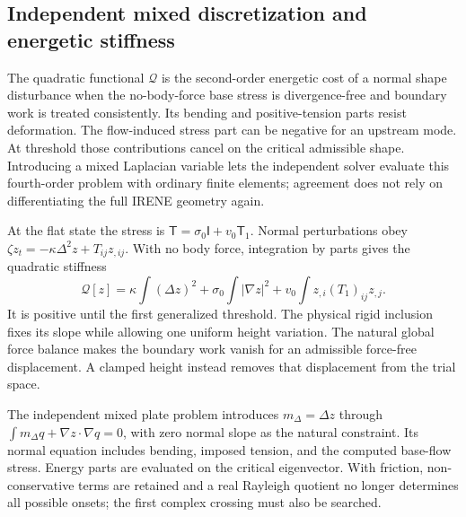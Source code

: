 \subsection{Independent mixed discretization and energetic stiffness}


The quadratic functional $\mathcal Q$ is the second-order energetic cost of a normal shape disturbance when the no-body-force base stress is divergence-free and boundary work is treated consistently. Its bending and positive-tension parts resist deformation. The flow-induced stress part can be negative for an upstream mode. At threshold those contributions cancel on the critical admissible shape. Introducing a mixed Laplacian variable lets the independent solver evaluate this fourth-order problem with ordinary finite elements; agreement does not rely on differentiating the full IRENE geometry again.


At the flat state the stress is $\mathsf T=\sigma_0\mathsf I+v_0\mathsf T_1$. Normal perturbations obey $\zeta z_t=-\kappa\Delta^2z+T_{ij}z_{,ij}$. With no body force, integration by parts gives the quadratic stiffness
\begin{equation}
\mathcal Q[z]=\kappa\int(\Delta z)^2+\sigma_0\int|\nabla z|^2+v_0\int z_{,i}(T_1)_{ij}z_{,j}.
\end{equation}
It is positive until the first generalized threshold. The physical rigid inclusion fixes its slope while allowing one uniform height variation. The natural global force balance makes the boundary work vanish for an admissible force-free displacement. A clamped height instead removes that displacement from the trial space.

The independent mixed plate problem introduces $m_\Delta=\Delta z$ through $\int m_\Delta q+\nabla z\cdot\nabla q=0$, with zero normal slope as the natural constraint. Its normal equation includes bending, imposed tension, and the computed base-flow stress. Energy parts are evaluated on the critical eigenvector. With friction, non-conservative terms are retained and a real Rayleigh quotient no longer determines all possible onsets; the first complex crossing must also be searched.




